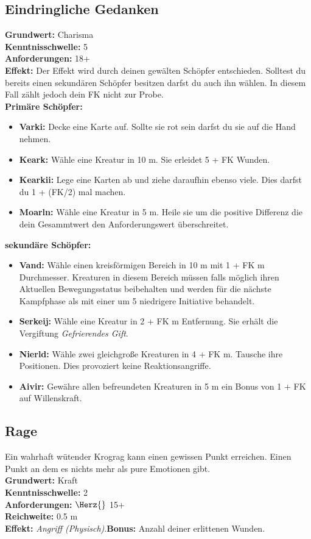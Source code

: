 \subsection*{Eindringliche Gedanken} \label{sk:eindringlichegedanken}
\textbf{Grundwert:} Charisma \\
\textbf{Kenntnisschwelle:} 5 \\
\textbf{Anforderungen:} 18+ \\
\textbf{Effekt:} Der Effekt wird durch deinen gewälten Schöpfer entschieden. Solltest du bereits einen sekundären Schöpfer besitzen darfst du auch ihn wählen. In diesem Fall zählt jedoch dein FK nicht zur Probe.\\ \textbf{Primäre Schöpfer:}
\begin{itemize}
    \item \textbf{Varki:} Decke eine Karte auf. Sollte sie rot sein darfst du sie auf die Hand nehmen.
    \item \textbf{Keark:} Wähle eine Kreatur in 10 m. Sie erleidet 5 + FK Wunden.
    \item \textbf{Kearkii:} Lege eine Karten ab und ziehe daraufhin ebenso viele. Dies darfst du 1 + (FK/2) mal machen.
    \item \textbf{Moarln:} Wähle eine Kreatur in 5 m. Heile sie um die positive Differenz die dein Gesammtwert den Anforderungswert überschreitet.
\end{itemize}
\textbf{sekundäre Schöpfer:}
\begin{itemize}
    \item \textbf{Vand:} Wähle einen kreisförmigen Bereich in 10 m mit 1 + FK m Durchmesser. Kreaturen in diesem Bereich müssen falls möglich ihren Aktuellen Bewegungsstatus beibehalten und werden für die nächste Kampfphase als mit einer um 5 niedrigere Initiative behandelt.
    \item \textbf{Serkeij:} Wähle eine Kreatur in 2 + FK m Entfernung. Sie erhält die Vergiftung \textit{Gefrierendes Gift}.
    \item \textbf{Nierld:} Wähle zwei gleichgroße Kreaturen in 4 + FK m. Tausche ihre Positionen. Dies provoziert keine Reaktionsangriffe.
    \item \textbf{Aivir:} Gewähre allen befreundeten Kreaturen in 5 m ein Bonus von 1 + FK auf Willenskraft.
\end{itemize}

\subsection*{Rage} \label{sk:rage}
Ein wahrhaft wütender Krograg kann einen gewissen Punkt erreichen. Einen Punkt an dem es nichts mehr als pure Emotionen gibt.\\
\textbf{Grundwert:} Kraft \\
\textbf{Kenntnisschwelle:} 2 \\
\textbf{Anforderungen:} $\Herz{}$ 15+ \\
\textbf{Reichweite:} 0.5 m \\
\textbf{Effekt:} \textit{Angriff (Physisch)}.\textbf{Bonus:} Anzahl deiner erlittenen Wunden.

